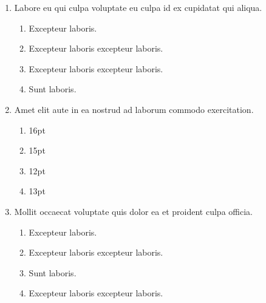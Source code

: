 \documentclass[a4paper,12pt]{article}
\begin{document}
\begin{enumerate}[label=\textbf{\arabic*.}]
\begin{multicols}{2}
\begin{enumerate}
	\end{enumerate}

\end{multicols}
\item Labore eu qui culpa voluptate eu culpa id ex cupidatat qui aliqua.
\begin{multicols}{2}
	\begin{enumerate}
		\item  Excepteur laboris.
    
		\item  Excepteur laboris excepteur laboris.
    
		\item  Excepteur laboris excepteur laboris.
  
		\item  Sunt laboris.
    
	\end{enumerate}

\end{multicols}
\item Amet elit aute in ea nostrud ad laborum commodo exercitation.
\begin{multicols}{4}
	\begin{enumerate}
		\item  16pt
  
		\item  15pt
    
		\item  12pt
    
		\item  13pt
    
	\end{enumerate}

\end{multicols}
\item Mollit occaecat voluptate quis dolor ea et proident culpa officia.
\begin{multicols}{2}
	\begin{enumerate}
		\item  Excepteur laboris.
    
		\item  Excepteur laboris excepteur laboris.
  
		\item  Sunt laboris.
    
		\item  Excepteur laboris excepteur laboris.
    
	\end{enumerate}


\end{multicols}
\end{enumerate}
\end{document}
